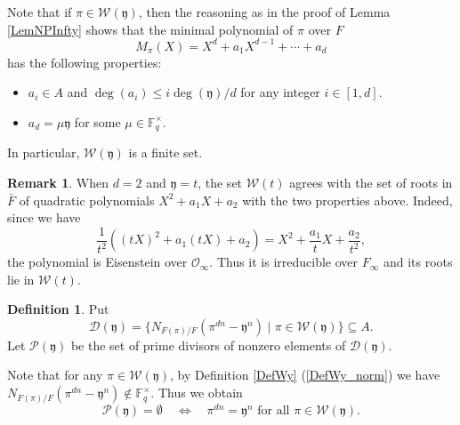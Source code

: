 \documentclass[10pt]{amsart}
\theoremstyle{plain}
\theoremstyle{definition}
\newtheorem{dfn}[thm]{Definition}
\newtheorem{rmk}[thm]{Remark}
\newcommand{\cD}{\mathcal{D}}
\newcommand{\cO}{\mathcal{O}}
\newcommand{\cP}{\mathcal{P}}
\newcommand{\cW}{\mathcal{W}}
\newcommand{\bF}{\mathbb{F}}
\newcommand{\fry}{\mathfrak{y}}
\begin{document}
Note that if $\pi\in \cW(\fry)$, then the reasoning as in the proof of Lemma \ref{LemNPInfty} shows that
the minimal polynomial of $\pi$ over $F$
\[
M_\pi(X)=X^d+a_1 X^{d-1}+\cdots+a_d
\]
has the following properties:
\begin{itemize}
	\item\label{CondWtMiddle} $a_i\in A$ and $\deg(a_i)\leq i\deg(\fry)/d$ for any integer $i\in [1,d]$.
	\item\label{CondWtConst} $a_d=\mu \fry$ for some $\mu\in \bF_q^\times$.
\end{itemize}
In particular, $\cW(\fry)$ is a finite set.

\begin{rmk}\label{RmkWt}
	When $d=2$ and $\fry=t$, the set $\cW(t)$ agrees with the set of roots in $\bar{F}$ of quadratic polynomials $X^2+a_1 X+a_2$
	with the two properties above. Indeed, since we have
	\[
	\frac{1}{t^2}((tX)^2+a_1(tX)+a_2)=X^2+\frac{a_1}{t} X +\frac{a_2}{t^2},
	\]
	the polynomial is Eisenstein over $\cO_\infty$. Thus it is irreducible over $F_\infty$ and its roots lie in $\cW(t)$.
\end{rmk}

\begin{dfn}\label{DefPy}
Put 
\[
\cD(\fry)=\{ N_{F(\pi)/F}(\pi^{dn}-\fry^{n})\mid \pi \in \cW(\fry)\}\subseteq A.
\]
Let $\cP(\fry)$ be the set of prime divisors of nonzero elements of $\cD(\fry)$.
\end{dfn}
Note that for any $\pi\in \cW(\fry)$, by Definition \ref{DefWy} (\ref{DefWy_norm}) 
we have $N_{F(\pi)/F}(\pi^{dn}-\fry^{n})\notin \bF_q^\times$. Thus we obtain
\begin{equation}\label{EqnPyEmpty}
	\cP(\fry)=\emptyset\quad\Leftrightarrow\quad \pi^{dn}=\fry^{n}\text{ for all }\pi \in \cW(\fry).
\end{equation}
\end{document}
